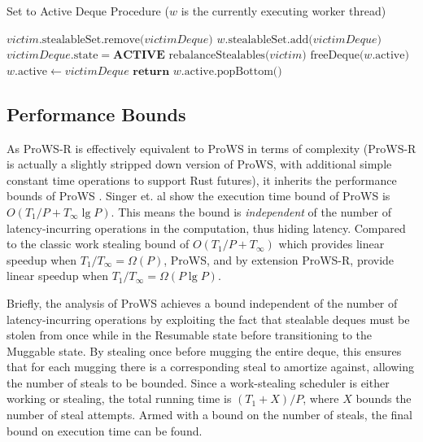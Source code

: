 \documentclass[bsc,frontabs,singlespacing,parskip,deptreport,normalheadings]{infthesis}
\begin{document}
\begin{algorithm}
\caption{Set to Active Deque Procedure ($w$ is the currently executing worker thread)}\label{alg:steal}
\begin{algorithmic}[1]
        \State $ victim \text{.stealableSet.remove(} victimDeque \text{)} $
        \State $ w \text{.stealableSet.add(} victimDeque \text{)} $
        \State $ victimDeque \text{.state} = \textbf{ACTIVE} $
        \State $ \text{rebalanceStealables(} victim \text{)} $
            \label{line:rebalance_2}
            \State $ \text{freeDeque(} w \text{.active)} $
        \EndIf
        \State $ w \text{.active} \gets victimDeque $
        \State $ \textbf{return } w \text{.active.popBottom()} $
    \EndFunction
\end{algorithmic}
\end{algorithm}

\subsection{Performance Bounds}
\label{subsection:performance_bounds}

As ProWS-R is effectively equivalent to ProWS in terms of complexity (ProWS-R is
actually a slightly stripped down version of ProWS, with additional simple
constant time operations to support Rust futures), it inherits the performance
bounds of ProWS \cite{singer_proactive_2019, singer_scheduling_2019}. Singer et.
al show the execution time bound of ProWS is \(O(T_1 / P + T_\infty \lg P)\).
This means the bound is \textit{independent} of the number of latency-incurring operations in
the computation, thus hiding latency. Compared to the classic work stealing
bound of \(O(T_1 / P + T_\infty)\) which provides linear speedup when \(T_1 /
T_\infty = \Omega(P)\), ProWS, and by extension ProWS-R, provide linear speedup
when \(T_1 / T_\infty = \Omega(P \lg P)\).

Briefly, the analysis of ProWS achieves a bound independent of the number of
latency-incurring operations by exploiting the fact that stealable deques must
be stolen from once while in the Resumable state before transitioning to the
Muggable state. By stealing once before mugging the entire deque, this ensures
that for each mugging there is a corresponding steal to amortize against,
allowing the number of steals to be bounded. Since a work-stealing scheduler is
either working or stealing, the total running time is \((T_1 + X) / P\), where
\(X\) bounds the number of steal attempts. Armed with a bound on the number of
steals, the final bound on execution time can be found.
\end{document}
